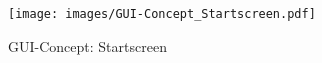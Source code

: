 \begin{figure}[h]
\begin{minipage}{.5\textwidth}
  \label{fig:test2}
\end{minipage}
\end{figure}

\begin{figure}[h]
\centering
\texttt{[image: images/GUI-Concept\_Startscreen.pdf]}
\caption{GUI-Concept: Startscreen}
\end{figure}
\clearpage
